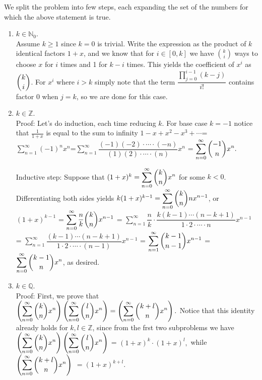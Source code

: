 \documentclass[11pt,a4paper]{article}
\begin{document}
We split the problem into few steps, each expanding the set of the numbers for which the above statement is true.
\begin {enumerate}
\item $k\in\mathbb{N}_0$.\\
Assume $k\ge 1$ since $k=0$ is trivial. Write the expression as the product of $k$ identical factors $1+x$, and we know that for $i\in[0,k]$ we have $\binom{k}{i}$ ways to choose $x$ for $i$ times and 1 for $k-i$ times. This yields the coefficient of $x^i$ as $\dbinom{k}{i}$. For $x^i$ where $i>k$ simply note that the term $\dfrac{\displaystyle\prod_{j=0}^{i-1} (k-j)}{i!}$ contains factor 0 when $j=k$, so we are done for this case.

\item $k\in\mathbb{Z}$.\\
Proof: Let's do induction, each time reducing $k$. For base case $k=-1$ notice that $\frac{1}{1+x}$ is equal to the sum to infinity $1-x+x^2-x^3+\cdots$=$\displaystyle\sum_{n=1}^{\infty} (-1)^{n}x^{n}$=$\displaystyle\sum_{n=1}^{\infty}\dfrac{(-1)(-2)\cdot\cdots\cdot(-n)}{(1)(2)\cdot\cdots\cdot(n)}x^n$ = $\displaystyle\sum_{n=0}^{\infty} \dbinom{-1}{n}x^n.$ 

Inductive step: Suppose that $(1+x)^k=\displaystyle\sum_{n=0}^{\infty} \dbinom {k}{n}x^n$ for some $k<0$. Differentiating both sides yields $k(1+x)^{k-1}=\displaystyle\sum_{n=0}^{\infty} \dbinom {k}{n}nx^{n-1}$, or $(1+x)^{k-1}$ = $\displaystyle\sum_{n=0}^{\infty} \dfrac{n}{k}\dbinom {k}{n}x^{n-1}$ = $\displaystyle\sum_{n=1}^{\infty} \dfrac{n}{k}\cdot\dfrac{k(k-1)\cdots (n-k+1)}{1\cdot 2\cdot\cdots \cdot n}x^{n-1}$ = $\displaystyle\sum_{n=1}^{\infty} \dfrac{(k-1)\cdots (n-k+1)}{1\cdot 2\cdot\cdots \cdot (n-1)}x^{n-1}$ = $\displaystyle\sum_{n=1}^{\infty} \dbinom {k-1}{n-1}x^{n-1}$ = $\displaystyle\sum_{n=0}^{\infty} \dbinom {k-1}{n}x^{n}$, as desired.

\item $k\in\mathbb{Q}$.\\
Proof: First, we prove that $\left(\displaystyle\sum_{n=0}^{\infty} \dbinom{k}{n} x^n\right)\left(\displaystyle\sum_{n=0}^{\infty} \dbinom{l}{n} x^n\right)=\left(\displaystyle\sum_{n=0}^{\infty} \dbinom{k+l}{n} x^n\right).$ Notice that this identity already holds for $k,l\in\mathbb{Z}$, since from the frst two subproblems we have $\left(\displaystyle\sum_{n=0}^{\infty} \dbinom{k}{n} x^n\right)\left(\displaystyle\sum_{n=0}^{\infty} \dbinom{l}{n} x^n\right)$ = $(1+x)^k\cdot(1+x)^l,$ while $\left(\displaystyle\sum_{n=0}^{\infty} \dbinom{k+l}{n}x^n\right)$ $=(1+x)^{k+l}.$


\end{enumerate}
\end{document}
